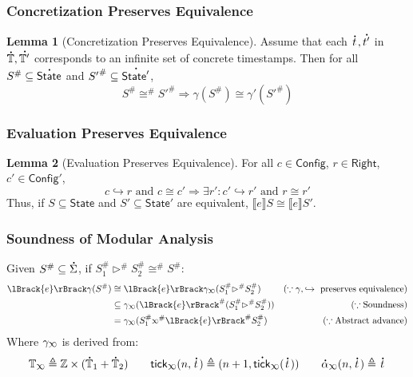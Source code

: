 \documentclass{beamer}
\theoremstyle{definition}
\newtheorem*{lemma*}{Lemma}
\newcommand*{\A}[1]{\overset{\,_{\mbox{\Large .}}}{#1}}
\newcommand*{\Abs}[1]{{#1}^{\#}}
\newcommand*{\Time}{\mathbb{T}}
\newcommand*{\ATime}{\A{\Time}}
\newcommand*{\Config}{\mathsf{Config}}
\newcommand*{\config}{c}
\newcommand*{\Right}{\mathsf{Right}}
\newcommand*{\rightst}{r}
\newcommand*{\State}{\mathsf{State}}
\newcommand*{\AState}{\A{\mathsf{State}}}
\newcommand*{\semarrow}{\hookrightarrow}
\newcommand*{\semlink}{\mathbin{\rotatebox[origin=c]{180}{$\propto$}}}
\newcommand*{\equivalent}{\cong}
\newcommand*{\sembracket}[1]{\lBrack{#1}\rBrack}
\newcommand*{\tick}{\mathsf{tick}}
\begin{document}
\begin{frame}[c]
  \frametitle{Concretization Preserves Equivalence}
  \begin{lemma*}[Concretization Preserves Equivalence]\label{lem:concreteqiuv}
    Assume that each $\A{t},\A{t'}$ in $\ATime,\A{\Time'}$ corresponds to an infinite set of concrete timestamps.
    Then for all $\Abs{S}\subseteq\AState$ and $\Abs{S'}\subseteq\A{\State'}$,
    \[\Abs{S}\Abs\equivalent\Abs{S'}\Rightarrow\gamma(\Abs{S})\equivalent\gamma'(\Abs{S'})\]
  \end{lemma*}
\end{frame}
\begin{frame}[c]
  \frametitle{Evaluation Preserves Equivalence}
  \begin{lemma*}[Evaluation Preserves Equivalence]
    For all $\config\in\Config$, $\rightst\in\Right$, $\config'\in\Config'$,
    \[\config\semarrow\rightst\text{ and }\config\equivalent\config'\Rightarrow\exists\rightst':\config'\semarrow\rightst'\text{ and }\rightst\equivalent\rightst'\]
    Thus, if $S\subseteq\State$ and $S'\subseteq\State'$ are equivalent, $\sembracket{e}S\equivalent\sembracket{e}S'$.
  \end{lemma*}
\end{frame}
\begin{frame}[c]
  \frametitle{Soundness of Modular Analysis}
  Given $\Abs{S}\subseteq\A\Sigma$,
  if $\Abs{S}_1\Abs\rhd\Abs{S}_2\Abs\equivalent\Abs{S}$:
  \begin{align*}
    \sembracket{e}\gamma(\Abs{S}) & \equivalent\sembracket{e}\gamma_{\semlink}(\Abs{S}_1\Abs\rhd\Abs{S}_2)       & (\because\gamma,\semarrow\text{ preserves equivalence}) \\
                                  & \subseteq\gamma_{\semlink}(\Abs{\sembracket{e}}(\Abs{S}_1\Abs\rhd\Abs{S}_2)) & (\because\text{Soundness})                              \\
                                  & =\gamma_{\semlink}(\Abs{S}_1\Abs\semlink\Abs{\sembracket{e}}\Abs{S}_2)       & (\because\text{Abstract advance})
  \end{align*}
  Where $\gamma_{\semlink}$ is derived from:
  \[\Time_{\semlink}\triangleq\mathbb{Z}\times(\ATime_1+\ATime_2)\qquad\tick_{\semlink}(n,\A{t})\triangleq(n+1,\A\tick_{\semlink}(\A{t}))\qquad\A\alpha_{\semlink}(n,\A{t})\triangleq\A{t}\]
\end{frame}
\end{document}
